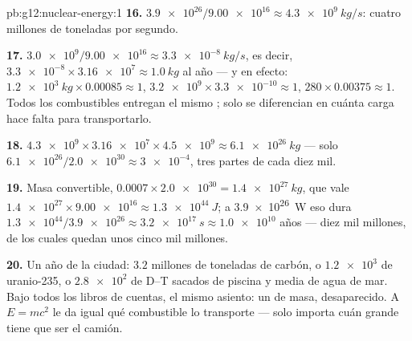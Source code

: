 \begin{solution}{pb:g12:nuclear-energy:1}
\textbf{16.} $\num{3.9e26}/\num{9.00e16} \approx \qty{4.3e9}{kg/s}$:
cuatro millones de toneladas por segundo.

\textbf{17.} $\num{3.0e9}/\num{9.00e16} \approx \qty{3.3e-8}{kg/s}$, es
decir, $\num{3.3e-8} \times \num{3.16e7} \approx \qty{1.0}{kg}$ al año
--- y en efecto: $\qty{1.2e3}{kg} \times 0.00085 \approx 1$,
$\num{3.2e9} \times \num{3.3e-10} \approx 1$,
$280 \times 0.00375 \approx 1$. Todos los combustibles entregan el mismo
; solo se diferencian en cuánta carga hace falta para
transportarlo.

\textbf{18.} $\num{4.3e9} \times \num{3.16e7} \times \num{4.5e9}
\approx \qty{6.1e26}{kg}$ --- solo
$\num{6.1e26}/\num{2.0e30} \approx \num{3e-4}$, tres partes de cada diez
mil.

\textbf{19.} Masa convertible,
$0.0007 \times \num{2.0e30} = \qty{1.4e27}{kg}$, que vale
$\num{1.4e27} \times \num{9.00e16} \approx \qty{1.3e44}{J}$; a
\qty{3.9e26}{W} eso dura
$\num{1.3e44}/\num{3.9e26} \approx \qty{3.2e17}{s} \approx \num{1.0e10}$
años --- diez mil millones, de los cuales quedan unos cinco mil
millones.

\textbf{20.} Un año de la ciudad: $3.2$ millones de toneladas de carbón,
o $\num{1.2e3}$  de uranio-235, o $\num{2.8e2}$  de
D--T sacados de piscina y media de agua de mar. Bajo todos los libros de
cuentas, el mismo asiento: un  de masa, desaparecido. A
$E = mc^2$ le da igual qué combustible lo transporte --- solo importa
cuán grande tiene que ser el camión.
\end{solution}
